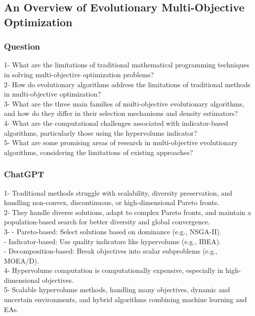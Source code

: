 \subsection{An Overview of Evolutionary Multi-Objective Optimization}
\subsubsection{Question}
\begin{tcolorbox}[breakable]
    1- What are the limitations of traditional mathematical programming techniques in solving multi-objective optimization problems?\\
2- How do evolutionary algorithms address the limitations of traditional methods in multi-objective optimization?\\
3- What are the three main families of multi-objective evolutionary algorithms, and how do they differ in their selection mechanisms and density estimators?\\
4- What are the computational challenges associated with indicator-based algorithms, particularly those using the hypervolume indicator?\\
5- What are some promising areas of research in multi-objective evolutionary algorithms, considering the limitations of existing approaches?\\

\end{tcolorbox}
\subsubsection{ChatGPT}
\begin{tcolorbox}[breakable]
    1- Traditional methods struggle with scalability, diversity preservation, and handling non-convex, discontinuous, or high-dimensional Pareto fronts.\\
2- They handle diverse solutions, adapt to complex Pareto fronts, and maintain a population-based search for better diversity and global convergence.\\
3-
   - Pareto-based: Select solutions based on dominance (e.g., NSGA-II).\\
   - Indicator-based: Use quality indicators like hypervolume (e.g., IBEA).\\
   - Decomposition-based: Break objectives into scalar subproblems (e.g., MOEA/D).\\

4- Hypervolume computation is computationally expensive, especially in high-dimensional objectives.\\
5- Scalable hypervolume methods, handling many objectives, dynamic and uncertain environments, and hybrid algorithms combining machine learning and EAs.\\

\end{tcolorbox}
